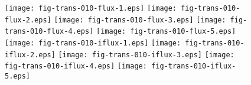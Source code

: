 \documentclass[a4paper,preprint,unsortedaddress,onecolumn]{revtex4-1}
\begin{document}
\begin{figure}
  \centering
  \texttt{[image: fig-trans-010-flux-1.eps]}
  \texttt{[image: fig-trans-010-flux-2.eps]}
  \texttt{[image: fig-trans-010-flux-3.eps]}
  \texttt{[image: fig-trans-010-flux-4.eps]}
  \texttt{[image: fig-trans-010-flux-5.eps]}\\
  \texttt{[image: fig-trans-010-iflux-1.eps]}
  \texttt{[image: fig-trans-010-iflux-2.eps]}
  \texttt{[image: fig-trans-010-iflux-3.eps]}
  \texttt{[image: fig-trans-010-iflux-4.eps]}
  \texttt{[image: fig-trans-010-iflux-5.eps]}

\end{figure}
\end{document}
